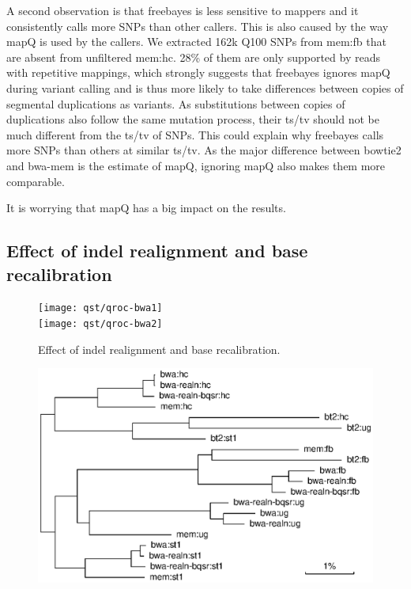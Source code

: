 \documentclass{bioinfo}
\newcommand{\textssf}[1]{\textsf{\footnotesize #1}}
\begin{document}
A second observation is that \textssf{freebayes} is less sensitive to mappers and it
consistently calls more SNPs than other callers. This is also caused by the way
mapQ is used by the callers. We extracted 162k Q100 SNPs from \textssf{mem:fb}
that are absent from unfiltered \textssf{mem:hc}. 28\% of them are only
supported by reads with repetitive mappings, which strongly suggests that
\textssf{freebayes} ignores mapQ during variant calling and is thus more likely
to take differences between copies of segmental duplications as variants. As
substitutions between copies of duplications also follow the same mutation
process, their ts/tv should not be much different from the ts/tv of SNPs. This
could explain why \textssf{freebayes} calls more SNPs than others at similar
ts/tv. As the major difference between \textssf{bowtie2} and \textssf{bwa-mem}
is the estimate of mapQ, ignoring mapQ also makes them more comparable.

It is worrying that mapQ has a big impact on the results.

\subsection{Effect of indel realignment and base recalibration}

\begin{figure}[!hp]
\centering\texttt{[image: qst/qroc-bwa1]}\\
\centering\texttt{[image: qst/qroc-bwa2]}
\caption{Effect of indel realignment and base recalibration.}\label{fig:qroc2} \end{figure}

\begin{figure}[!hp]
\includegraphics[width=.49\textwidth]{tree}
\label{fig:tree} \end{figure}
\end{document}
